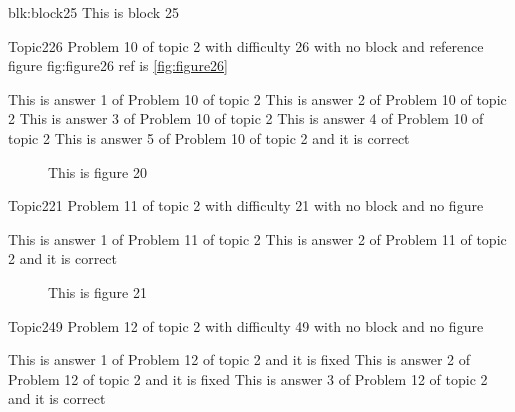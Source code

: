 \documentclass[master]{exam}
\begin{document}
\begin{block}{blk:block25}
This is block 25
\end{block}


\begin{problem}{Topic2}{26}
	Problem 10 of topic 2 with difficulty 26 with no block and reference figure fig:figure26 ref is \ref{fig:figure26}
	\begin{answers}
		\answer This is answer 1 of Problem 10 of topic 2 
		\answer This is answer 2 of Problem 10 of topic 2 
		\answer This is answer 3 of Problem 10 of topic 2 
		\answer This is answer 4 of Problem 10 of topic 2 
		\answer[correct] This is answer 5 of Problem 10 of topic 2 and it is correct
	\end{answers}
\end{problem}



\begin{figure}
	\begin{center}
		This is figure 20 
		\label{fig:figure20}
	\end{center}
\end{figure}

\begin{problem}{Topic2}{21}
	Problem 11 of topic 2 with difficulty 21 with no block and no figure
	\begin{answers}
		\answer This is answer 1 of Problem 11 of topic 2 
		\answer[correct] This is answer 2 of Problem 11 of topic 2 and it is correct
	\end{answers}
\end{problem}



\begin{figure}
	\begin{center}
		This is figure 21 
		\label{fig:figure21}
	\end{center}
\end{figure}

\begin{problem}{Topic2}{49}
	Problem 12 of topic 2 with difficulty 49 with no block and no figure
	\begin{answers}
		\answer[fixed] This is answer 1 of Problem 12 of topic 2 and it is fixed
		\answer[fixed] This is answer 2 of Problem 12 of topic 2 and it is fixed
		\answer[correct] This is answer 3 of Problem 12 of topic 2 and it is correct
	\end{answers}
\end{problem}
\end{document}
